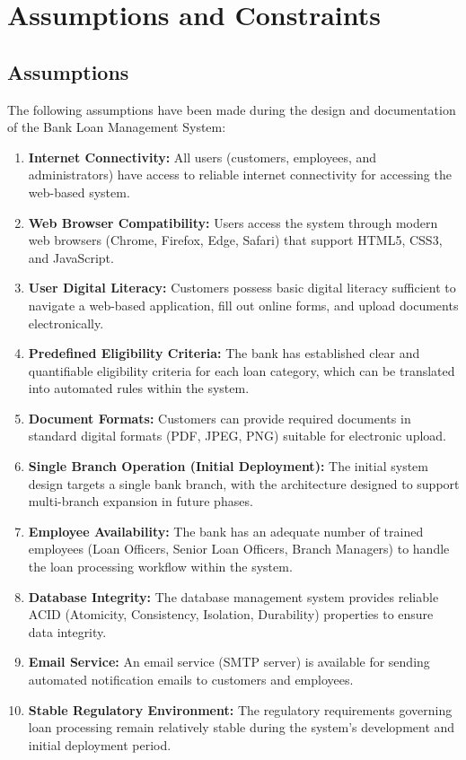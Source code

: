 \section{Assumptions and Constraints}

\subsection{Assumptions}

The following assumptions have been made during the design and documentation of the Bank Loan Management System:

\begin{enumerate}
  \item \textbf{Internet Connectivity:} All users (customers, employees, and administrators) have access to reliable internet connectivity for accessing the web-based system.
  \item \textbf{Web Browser Compatibility:} Users access the system through modern web browsers (Chrome, Firefox, Edge, Safari) that support HTML5, CSS3, and JavaScript.
  \item \textbf{User Digital Literacy:} Customers possess basic digital literacy sufficient to navigate a web-based application, fill out online forms, and upload documents electronically.
  \item \textbf{Predefined Eligibility Criteria:} The bank has established clear and quantifiable eligibility criteria for each loan category, which can be translated into automated rules within the system.
  \item \textbf{Document Formats:} Customers can provide required documents in standard digital formats (PDF, JPEG, PNG) suitable for electronic upload.
  \item \textbf{Single Branch Operation (Initial Deployment):} The initial system design targets a single bank branch, with the architecture designed to support multi-branch expansion in future phases.
  \item \textbf{Employee Availability:} The bank has an adequate number of trained employees (Loan Officers, Senior Loan Officers, Branch Managers) to handle the loan processing workflow within the system.
  \item \textbf{Database Integrity:} The database management system provides reliable ACID (Atomicity, Consistency, Isolation, Durability) properties to ensure data integrity.
  \item \textbf{Email Service:} An email service (SMTP server) is available for sending automated notification emails to customers and employees.
  \item \textbf{Stable Regulatory Environment:} The regulatory requirements governing loan processing remain relatively stable during the system's development and initial deployment period.
\end{enumerate}

